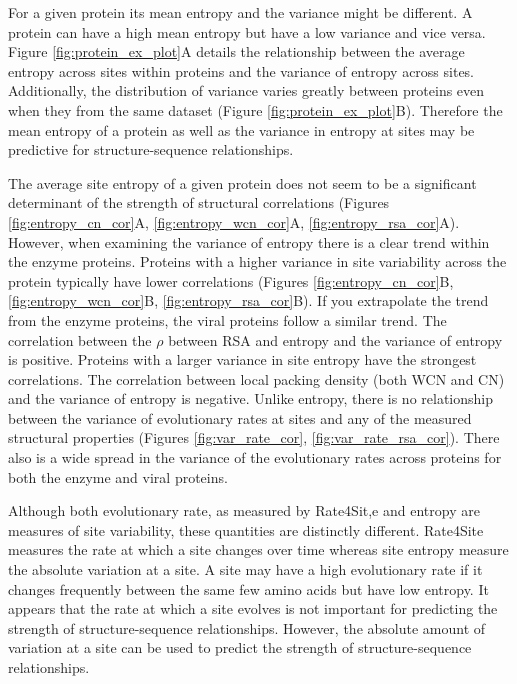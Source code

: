 \documentclass[12pt]{article}
\begin{document}
\indent For a given protein its mean entropy and the variance might be different. A protein can have a high mean entropy but have a low variance and vice versa. Figure \ref{fig:protein_ex_plot}A details the relationship between the average entropy across sites within proteins and the variance of entropy across sites. Additionally, the distribution of variance varies greatly between proteins even when they from the same dataset (Figure \ref{fig:protein_ex_plot}B). Therefore the mean entropy of a protein as well as the variance in entropy at sites may be predictive for structure-sequence relationships.

\indent  The average site entropy of a given protein does not seem to be a significant determinant of the strength of structural correlations (Figures \ref{fig:entropy_cn_cor}A, \ref{fig:entropy_wcn_cor}A, \ref{fig:entropy_rsa_cor}A). However, when examining the variance of entropy there is a clear trend within the enzyme proteins.  Proteins with a higher variance in site variability across the protein typically have lower correlations (Figures \ref{fig:entropy_cn_cor}B, \ref{fig:entropy_wcn_cor}B, \ref{fig:entropy_rsa_cor}B). If you extrapolate the trend from the enzyme proteins, the viral proteins follow a similar trend. The correlation between the $\rho$ between RSA and entropy and the variance of entropy is positive. Proteins with a larger variance in site entropy have the strongest correlations. The correlation between local packing density (both WCN and CN) and the variance of entropy is negative. Unlike entropy, there is no relationship between the variance of evolutionary rates at sites and any of the measured structural properties (Figures \ref{fig:var_rate_cor}, \ref{fig:var_rate_rsa_cor}). There also is a wide spread in the variance of the evolutionary rates across proteins for both the enzyme and viral proteins. 

\indent Although both evolutionary rate, as measured by Rate4Sit,e and entropy are measures of site variability, these quantities are distinctly different. Rate4Site measures the rate at which a site changes over time whereas site entropy measure the absolute variation at a site. A site may have a high evolutionary rate if it changes  frequently between the same few amino acids but have low entropy. It appears that the rate at which a site evolves is not important for predicting the strength of structure-sequence relationships. However, the absolute amount of variation at a site can be used to predict the strength of structure-sequence relationships. 
\end{document}
